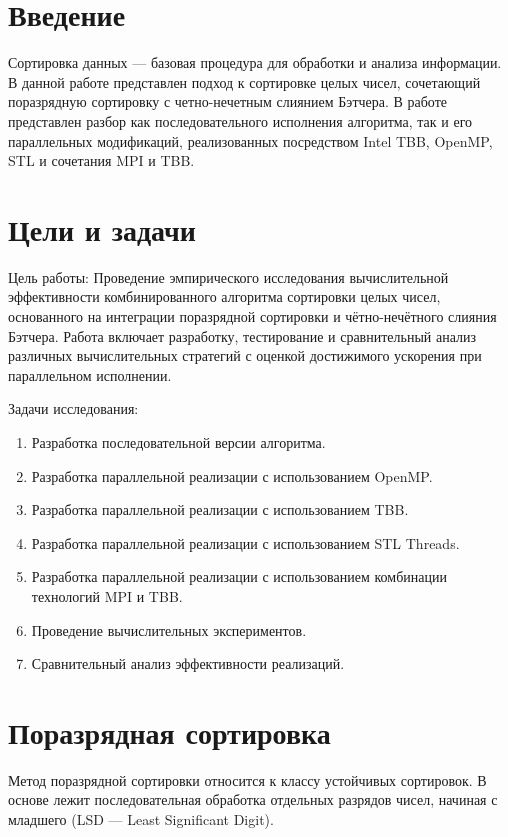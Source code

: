 \documentclass[12pt,a4paper]{extarticle}
\begin{document}
	\newpage


	\section*{Введение}
	Сортировка данных — базовая процедура для обработки и анализа информации. В данной работе представлен подход к сортировке целых чисел, сочетающий поразрядную сортировку с четно-нечетным слиянием Бэтчера. В работе представлен разбор как последовательного исполнения алгоритма, так и его параллельных модификаций, реализованных посредством Intel TBB, OpenMP, STL и сочетания MPI и TBB.

	\section*{Цели и задачи}	
	Цель работы:
	Проведение эмпирического исследования вычислительной эффективности комбинированного алгоритма сортировки целых чисел, основанного на интеграции поразрядной сортировки и чётно-нечётного слияния Бэтчера. Работа включает разработку, тестирование и сравнительный анализ различных вычислительных стратегий с оценкой достижимого ускорения при параллельном исполнении.

	Задачи исследования:

	\begin{enumerate}
		\item Разработка последовательной версии алгоритма.
		\item Разработка параллельной реализации с использованием OpenMP.
		\item Разработка параллельной реализации с использованием TBB.
		\item Разработка параллельной реализации с использованием STL Threads.
		\item Разработка параллельной реализации с использованием комбинации технологий MPI и TBB.
		\item Проведение вычислительных экспериментов.
		\item Сравнительный анализ эффективности реализаций.
	\end{enumerate}

	\section{Поразрядная сортировка}

	Метод поразрядной сортировки относится к классу устойчивых сортировок. В основе лежит последовательная обработка отдельных разрядов чисел, начиная с младшего (LSD — Least Significant Digit).
  
\end{document}
